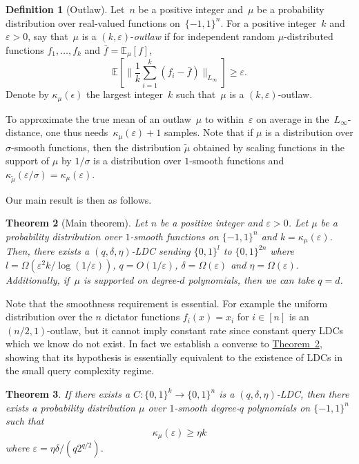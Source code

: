 \documentclass[11pt]{article}
\numberwithin{equation}{section}
\newtheorem{theorem}{Theorem}[section]
\theoremstyle{definition}
\newtheorem{definition}[theorem]{Definition}
\theoremstyle{plain}
\newcommand{\expref}[2]{\hyperref[#2]{#1~\ref{#2}}}
\newcommand{\bset}[1]{\{0,1\}^{#1}} %
\newcommand{\pmset}[1]{\{-1,1\}^{#1}} %
\newcommand{\sBC}{{\{-1,1\}}}
\newcommand{\Exp}{{\mathbb{E}}}
\newcommand{\eps}{\varepsilon}
\newcommand{\beqn}{\begin{equation*}}
\newcommand{\eeqn}{\end{equation*}}
\begin{document}
\begin{definition}[Outlaw]\label{def:outlaw}
Let~$n$ be a positive integer and~$\mu$ be a probability distribution over real-valued functions on~$\pmset{n}$.
For a positive integer~$k$ and ${\eps > 0}$, say that~$\mu$ is a $(k, \eps)$-\emph{outlaw} if
for independent random $\mu$-distributed functions $f_1,\dots,f_{k}$ and $\bar f = \Exp_\mu[f]$,
\beqn
\Exp\left[\Big\|\frac{1}{k}\sum_{i=1}^k (f_i - \bar f)\Big\|_{L_\infty}\right] \geq \eps.
\eeqn
Denote by $\kappa_\mu(\epsilon)$ the largest integer~$k$ such that~$\mu$ is a $(k,\eps)$-outlaw.
\end{definition}

To approximate the true mean of an outlaw~$\mu$ to within~$\eps$ on average in the~$L_\infty$-distance, one thus needs~$\kappa_\mu(\eps)+1$ samples. Note that if $\mu$ is a distribution over $\sigma$-smooth functions, then the distribution $\tilde{\mu}$ obtained by scaling functions in the support of $\mu$ by $1/\sigma$ is a distribution over $1$-smooth functions and $\kappa_{\tilde{\mu}}(\eps/\sigma)=\kappa_{\mu}(\eps)$.

Our main result is then as follows.


\begin{theorem}[Main theorem]\label{thm:main}
Let $n$ be a positive integer and $\eps >0 $.
Let $\mu$ be a probability distribution over $1$-smooth functions on $\pmset{n}$ and $k = \kappa_\mu(\eps)$.
Then, there exists a $(q,\delta,\eta)$-LDC sending $\bset{l}$ to $\bset{2n}$ where $l=\Omega(\eps^2 k/\log(1/\eps))$, $q=O(1/\eps)$, $\delta =\Omega(\eps)$ and $\eta=\Omega(\eps)$.
Additionally, if~$\mu$ is supported on degree-$d$ polynomials, then we can take $q=d$.
\end{theorem}


Note that the smoothness requirement is essential. For example the uniform distribution over the $n$ dictator functions $f_i(x)=x_i$ for $i\in [n]$ is an $(n/2,1)$-outlaw, but it cannot imply constant rate since constant query LDCs which we know do not exist. In fact we establish a converse to \expref{Theorem}{thm:main}, showing that its hypothesis is essentially equivalent to the existence of LDCs in the small query complexity regime.


\begin{theorem}\label{thm:main_converse}
If there exists a $C:\bset{k}\to \bset{n}$ is a $(q,\delta, \eta)$-LDC, then there exists a probability distribution $\mu$ over $1$-smooth degree-$q$ polynomials on $\sBC^n$ such that $$\kappa_\mu(\eps)\ge \eta k$$ where $\eps=\eta\delta/(q2^{q/2})$.
\end{theorem}
\end{document}
